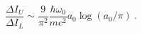 \begin{equation}\label{ct99-16}
\frac{\Delta I_U}{\Delta I_L}\sim\frac{9}{\pi ^2}\frac{\hbar \omega _0}{mc^2}a_0\log (a_0/\pi)~.
\end{equation}

